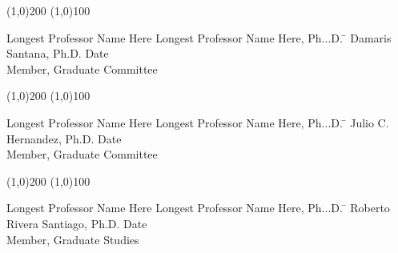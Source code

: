 \begin{titlepage}
  \noindent
\line(1,0){200} \hspace{40 mm} \line(1,0){100}\\
  \noindent
\vspace{-1.75\baselineskip}
  \begin{tabbing}
Longest Professor Name Here Longest Professor Name Here, Ph...D. \=  \kill 
Damaris Santana, Ph.D. \>  Date\\Member, Graduate Committee  %
\end{tabbing}



  \noindent
\line(1,0){200} \hspace{40 mm} \line(1,0){100}\\
  \noindent
\vspace{-1.75\baselineskip}
  \begin{tabbing}
Longest Professor Name Here Longest Professor Name Here, Ph...D.   \=  \kill 
Julio C. Hernandez, Ph.D. \>  Date\\Member, Graduate Committee %
\end{tabbing}


  \noindent
\line(1,0){200} \hspace{40 mm} \line(1,0){100}\\
  \noindent
\vspace{-1.75\baselineskip}
  \begin{tabbing}
Longest Professor Name Here Longest Professor Name Here, Ph...D.  \=  \kill 
Roberto Rivera Santiago, Ph.D. \>  Date\\Member, Graduate Studies  %
\end{tabbing}

\end{titlepage}
